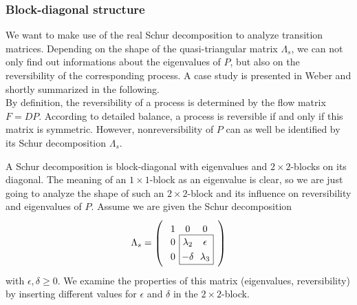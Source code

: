 \subsubsection*{Block-diagonal structure}

We want to make use of the real Schur decomposition to analyze transition matrices.
Depending on the shape of the quasi-triangular matrix $\Lambda_s$, we can not only find out informations about the eigenvalues of $P$, but also on the reversibility of the corresponding process.
A case study is presented in Weber\cite{Weber2017} and shortly summarized in the following.
\\

By definition, the reversibility of a process is determined by the flow matrix $F = DP$. According to detailed balance, a process is reversible if and only if this matrix is symmetric.
However, nonreversibility of $P$ can as well be identified by its Schur decomposition $\Lambda_s$. %


A Schur decomposition is block-diagonal with eigenvalues and $2 \times 2$-blocks on its diagonal. The meaning of an $1 \times 1$-block as an eigenvalue is clear, so we are just going to analyze the shape of such an $2 \times 2$-block and its influence on reversibility and eigenvalues of $P$.
Assume we are given the Schur decomposition
\begin{equation}
\label{eq:schur_block}
\Lambda_s = 
\begin{tikzpicture}[baseline=-0.5ex]
\matrix [matrix of math nodes,left delimiter=(,right delimiter=)] (m)
{
	1    & 0  & 0     \\
	0 & \lambda_2   & \epsilon      \\
	0   & -\delta    & \lambda_3       \\
} ;

\draw (m-2-2.north west) rectangle (m-3-3.south east);
\end{tikzpicture}
\end{equation}
with $\epsilon,\delta \geq 0$.
We examine the properties of this matrix (eigenvalues, reversibility) by inserting different values for $\epsilon$ and $\delta$ in the $2 \times 2$-block.

